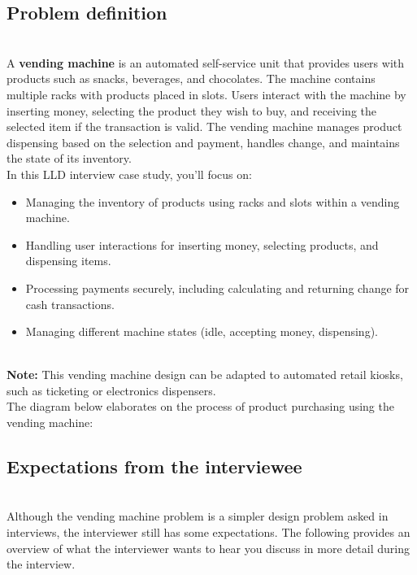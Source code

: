

\subsection{Problem definition}\label{-N5LI3p7HyvOu2woinYv--1}
\\
A \textbf{vending machine} is an automated self-service unit that provides users with products such as snacks, beverages, and chocolates. The machine contains multiple racks with products placed in slots. Users interact with the machine by inserting money, selecting the product they wish to buy, and receiving the selected item if the transaction is valid. The vending machine manages product dispensing based on the selection and payment, handles change, and maintains the state of its inventory.
\\
In this LLD interview case study, you'll focus on:

\begin{itemize}
\item
\protect{}\label{IoX2noXo38aIitVkJqVcu}
Managing the inventory of products using racks and slots within a vending machine.
\item
\protect{}\label{yptL9_X4wf2CzgKUIgVi_}
Handling user interactions for inserting money, selecting products, and dispensing items.
\item
\protect{}\label{VkY-iZgi2rCLpjK1qgvgS}
Processing payments securely, including calculating and returning change for cash transactions.
\item
\protect{}\label{7Eh4GpNA2Tsksjvx7zNc5}
Managing different machine states (idle, accepting money, dispensing).
\end{itemize}
\\
\textbf{Note:} This vending machine design can be adapted to automated retail kiosks, such as ticketing or electronics dispensers.
\\
The diagram below elaborates on the process of product purchasing using the vending machine:

\subsection{Expectations from the interviewee}\label{-N5LI3p7HyvOu2woinYv--2}
\\
Although the vending machine problem is a simpler design problem asked in interviews, the interviewer still has some expectations. The following provides an overview of what the interviewer wants to hear you discuss in more detail during the interview.

